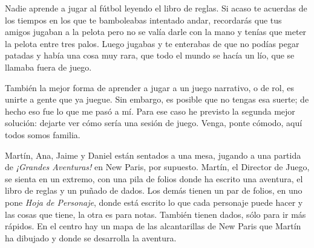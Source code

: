 
Nadie aprende a jugar al fútbol leyendo el libro de reglas. Si acaso te acuerdas de los tiempos en los que te bamboleabas intentado andar, recordarás que tus amigos jugaban a la pelota pero no se valía darle con la mano y tenías que meter la pelota entre tres palos. Luego jugabas y te enterabas de que no podías pegar patadas y había una cosa muy rara, que todo el mundo se hacía un lío, que se llamaba fuera de juego.

También la mejor forma de aprender a jugar a un juego narrativo, o de rol, es unirte a gente que ya juegue. Sin embargo, es posible que no tengas esa suerte; de hecho eso fue lo que me pasó a mí. Para ese caso he previsto la segunda mejor solución: dejarte ver cómo sería una sesión de juego. Venga, ponte cómodo, aquí todos somos familia.

Martín, Ana, Jaime y Daniel están sentados a una mesa, jugando a una partida de \emph{¡Grandes Aventuras!} en New Paris, por supuesto. Martín, el Director de Juego, se sienta en un extremo, con una pila de folios donde ha escrito una aventura, el libro de reglas y un puñado de dados. Los demás tienen un par de folios, en uno pone \emph{Hoja de Personaje}, donde está escrito lo que cada personaje puede hacer y las cosas que tiene, la otra es para notas. También tienen dados, sólo para ir más rápidos. En el centro hay un mapa de las alcantarillas de New Paris que Martín ha dibujado y donde se desarrolla la aventura.

